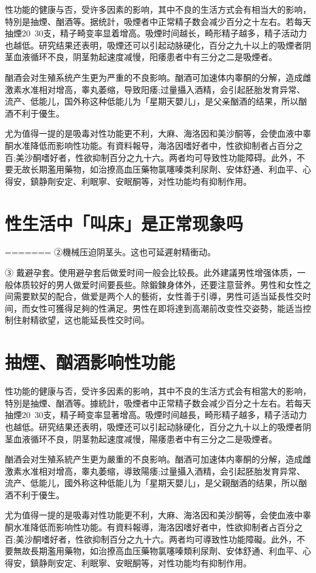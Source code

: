 \documentclass[12pt,UTF8]{ctexbook}
\begin{document}
性功能的健康与否，受许多因素的影响，其中不良的生活方式会有相当大的影响，特別是抽煙、酗酒等。据统計，吸煙者中正常精子数会减少百分之十左右。若每天抽煙20~30支，精子畸变率显着增高。吸煙时间越长，畸形精子越多，精子活动力也越低。研究结果还表明，吸煙还可以引起动脉硬化，百分之九十以上的吸煙者阴茎血液循环不良，阴茎勃起速度减慢，阳痿患者中有三分之二是吸煙者。

酗酒会对生殖系统产生更为严重的不良影响。酗酒可加速体内睾酮的分解，造成雌激素水准相对增高，睾丸萎缩，导致阳痿;过量攝入酒精，会引起胚胎发育异常、流产、低能儿，国外称这种低能儿为「星期天嬰儿」，是父亲酗酒的结果，所以酗酒不利于優生。

尤为值得一提的是吸毒对性功能更不利，大麻、海洛因和美沙酮等，会使血液中睾酮水准降低而影响性功能。有資料報导，海洛因嗜好者中，性欲抑制者占百分之百;美沙酮嗜好者，性欲抑制百分之九十六。两者均可导致性功能障碍。此外，不要无故长期濫用藥物，如治撩高血压藥物氯噻嗪类利尿劑、安体舒通、利血平、心得安，鎮静劑安定、利眠寧、安眠酮等，对性功能均有抑制作用。

\section{性生活中「叫床」是正常现象吗}
=======
②機械压迫阴茎头。这也可延遲射精衝动。

③ 戴避孕套。使用避孕套后做爱时间一般会比较長。此外建議男性增强体质，一般体质较好的男人做爱时间要長些。除鍛鍊身体外，还要注意营养。男性和女性之间需要默契的配合，做爱是两个人的藝術，女性善于引導，男性可适当延長性交时间，而女性可獲得足夠的性满足。男性在即将達到高潮前改变性交姿勢，能适当控制住射精欲望，这也能延長性交时间。

\section{抽煙、酗酒影响性功能}

性功能的健康与否，受许多因素的影响，其中不良的生活方式会有相當大的影响，特別是抽煙、酗酒等。據統計，吸煙者中正常精子数会减少百分之十左右。若每天抽煙20~30支，精子畸变率显著增高。吸煙时间越長，畸形精子越多，精子活动力也越低。研究结果还表明，吸煙还可以引起动脉硬化，百分之九十以上的吸煙者阴茎血液循环不良，阴茎勃起速度减慢，陽痿患者中有三分之二是吸煙者。

酗酒会对生殖系統产生更为嚴重的不良影响。酗酒可加速体内睾酮的分解，造成雌激素水准相对增高，睾丸萎缩，導致陽痿;过量攝入酒精，会引起胚胎发育异常、流产、低能儿，國外称这种低能儿为「星期天嬰儿」，是父親酗酒的结果，所以酗酒不利于優生。

尤为值得一提的是吸毒对性功能更不利，大麻、海洛因和美沙酮等，会使血液中睾酮水准降低而影响性功能。有資料報導，海洛因嗜好者中，性欲抑制者占百分之百;美沙酮嗜好者，性欲抑制百分之九十六。两者均可導致性功能障礙。此外，不要無故長期濫用藥物，如治撩高血压藥物氯噻嗪類利尿劑、安体舒通、利血平、心得安，鎮静劑安定、利眠寧、安眠酮等，对性功能均有抑制作用。
\end{document}
